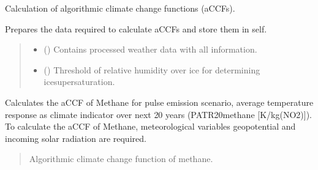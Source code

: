 \documentclass[a4paper,11pt,english]{sphinxmanual}
\begin{document}
\begin{fulllineitems}
\label{\detokenize{modules:envlib.accf.GeTaCCFs}}
\pysigstartsignatures
{}
\pysigstopsignatures
\sphinxAtStartPar
Calculation of algorithmic climate change functions (aCCFs).

\begin{fulllineitems}
\label{\detokenize{modules:envlib.accf.GeTaCCFs.__init__}}
\pysigstartsignatures
{}
\pysigstopsignatures
\sphinxAtStartPar
Prepares the data required to calculate aCCFs and store them in self.
\begin{quote}\begin{description}
\begin{itemize}
\item {} 
\sphinxAtStartPar
{} () \textendash{} Contains processed weather data with all information.

\item {} 
\sphinxAtStartPar
{} () \textendash{} Threshold of relative humidity over ice for determining ice\sphinxhyphen{}supersaturation.

\end{itemize}

\end{description}\end{quote}

\end{fulllineitems}


\begin{fulllineitems}
\label{\detokenize{modules:envlib.accf.GeTaCCFs.accf_ch4}}
\pysigstartsignatures
{}
\pysigstopsignatures
\sphinxAtStartPar
Calculates the aCCF of Methane for pulse emission scenario, average temperature response as climate
indicator over next 20 years (P\sphinxhyphen{}ATR20\sphinxhyphen{}methane {[}K/kg(NO2){]}). To calculate the aCCF of Methane, meteorological
variables geopotential and incoming solar radiation are required.
\begin{quote}\begin{description}
\sphinxAtStartPar
Algorithmic climate change function of methane.


\end{description}
\end{quote}
\end{fulllineitems}
\end{fulllineitems}
\end{document}

